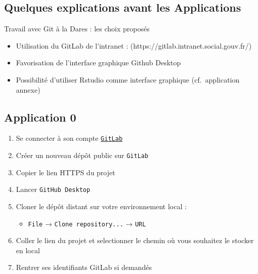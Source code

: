 \documentclass[
  letterpaper,
  DIV=11,
  numbers=noendperiod]{scrartcl}
\providecommand{\tightlist}{%
  \setlength{\itemsep}{0pt}\setlength{\parskip}{0pt}}\usepackage{longtable,booktabs,array}
\begin{document}
\hypertarget{quelques-explications-avant-les-applications}{%
\subsection{Quelques explications avant les
Applications}\label{quelques-explications-avant-les-applications}}

Travail avec Git à la Dares : les choix proposés

\begin{itemize}
\tightlist
\item
  Utilisation du GitLab de l'intranet :
  (https://gitlab.intranet.social.gouv.fr/)
\item
  Favorisation de l'interface graphique Github Desktop
\item
  Possibilité d'utiliser Rstudio comme interface graphique
  (cf.~application annexe)
\end{itemize}

\hypertarget{application-0}{%
\subsection{Application 0}\label{application-0}}

\begin{tcolorbox}[enhanced jigsaw, colframe=quarto-callout-tip-color-frame, rightrule=.15mm, breakable, colbacktitle=quarto-callout-tip-color!10!white, coltitle=black, toptitle=1mm, title={Préparation de l'environnement de travail}, titlerule=0mm, leftrule=.75mm, colback=white, bottomrule=.15mm, bottomtitle=1mm, toprule=.15mm, opacitybacktitle=0.6, arc=.35mm, left=2mm, opacityback=0]

\begin{enumerate}
\def\labelenumi{\arabic{enumi}.}
\tightlist
\item
  Se connecter à son compte
  \href{https://gitlab.intranet.social.gouv.fr/}{\texttt{GitLab}}
\item
  Créer un nouveau dépôt public sur \texttt{GitLab}
\item
  Copier le lien HTTPS du projet
\item
  Lancer \texttt{GitHub\ Desktop}
\item
  Cloner le dépôt distant sur votre environnement local :

  \begin{itemize}
  \tightlist
  \item
    \texttt{File} → \texttt{Clone\ repository...} → \texttt{URL}
  \end{itemize}
\item
  Coller le lien du projet et selectionner le chemin où vous souhaitez
  le stocker en local
\item
  Rentrer ses identifiants GitLab si demandés
\end{enumerate}

\end{tcolorbox}
\end{document}
